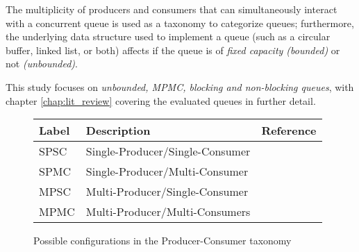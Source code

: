 The multiplicity of producers and
consumers that can simultaneously interact with a concurrent queue is used as a
taxonomy to categorize queues;
furthermore, the underlying data structure used to implement a queue (such as a
circular buffer, linked list, or both) affects if the queue is of \emph{fixed
capacity (bounded)} or not \emph{(unbounded)}. 

This study focuses on \emph{unbounded, MPMC, blocking and
non-blocking queues}, with chapter \ref{chap:lit_review} covering the evaluated
queues in further detail.

\begin{figure}[h]\centering
\caption{Possible configurations in the Producer-Consumer taxonomy}\label{tab:producer_consumer}
    \begin{tabular}{lll}
        \hline
        Label & Description & Reference \\ \hline
        SPSC & Single-Producer/Single-Consumer & \citep{aldinucci2012efficient} \\
        SPMC & Single-Producer/Multi-Consumer & \citep{arnautov2017ffq} \\
        MPSC & Multi-Producer/Single-Consumer & \\
        MPMC & Multi-Producer/Multi-Consumers & \citep{michael1996simple,valois1994queues,hoffman2007baskets}\\ \hline
    \end{tabular}        
\end{figure}

